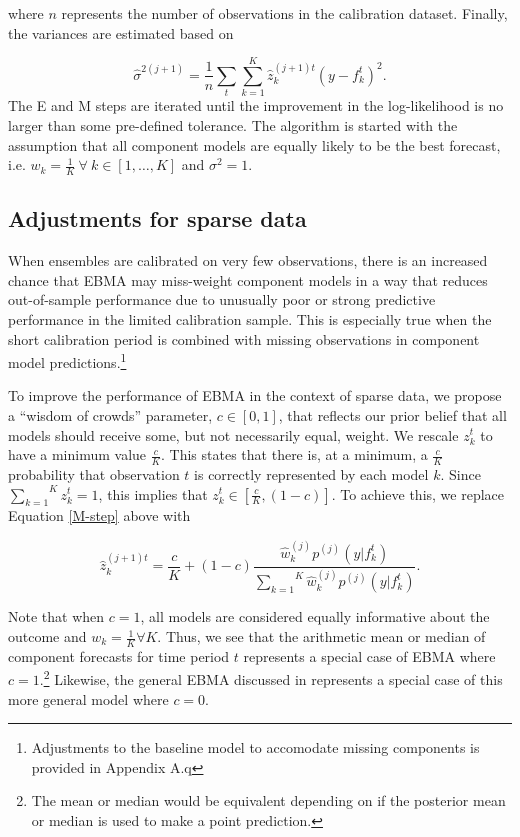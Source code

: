 \documentclass[12pt,fullpage,endnotes]{article}
\begin{document}
\noindent where $n$ represents the number of observations in the
calibration dataset. Finally, the variances are estimated based on

\begin{equation}
\label{sigma}
\hat{\sigma}^{2(j+1)}=\frac{1}{n}\underset{t}{\sum}\overset{K}{\underset{k=1}{\sum}}\hat{z}^{(j+1)t}_{k}(y-f_{k}^{t})^2.
\end{equation}
\noindent The E and M steps are iterated until the improvement in the
log-likelihood is no larger than some pre-defined tolerance. The algorithm is started with the assumption that all component models are equally likely to be the best forecast, i.e. $w_k = \frac{1}{K} ~ \forall ~ k \in [1, \ldots, K]$ and
$\sigma^2=1$.

\subsection{Adjustments for sparse data}

When ensembles are calibrated on very few observations, there is an
increased chance that EBMA may miss-weight component models in a way
that reduces out-of-sample performance due to unusually poor or strong
predictive performance in the limited calibration sample. This is
especially true when the short calibration period is combined with
missing observations in component model
predictions.\footnote{Adjustments to the baseline model to accomodate
  missing components is provided in Appendix A.q}

To improve the performance of EBMA in the context of sparse data, we
propose a ``wisdom of crowds'' parameter, $c \in [0,1]$, that reflects
our prior belief that all models should receive some, but not
necessarily equal, weight. We rescale $z^t_k$ to have a minimum value
$\frac{c}{K}$.  This states that there is, at a minimum, a
$\frac{c}{K}$ probability that observation $t$ is correctly
represented by each model $k$.  Since
$\overset{K}{\underset{k=1}{\sum}} z_k^t = 1$, this implies that
$z_k^t \in [\frac{c}{K}, (1-c)]$.  To achieve this, we replace
Equation \ref{M-step} above with

\begin{equation}
\hat{z}^{(j+1)t}_{k} = \frac{c}{K} + (1-c)\frac{\hat{w}^{(j)}_k
p^{(j)}(y|f_{k}^{t})}{\overset{K}{\underset{k=1}{\sum}}\hat{w}^{(j)}_kp^{(j)}(y|f_{k}^{t})}.
\end{equation}

Note that when $c=1$, all models are considered equally informative
about the outcome and $w_k=\frac{1}{K} \forall K$. Thus, we see that
the arithmetic mean or median of component forecasts for time period
$t$ represents a special case of EBMA where $c=1$.\footnote{The mean
  or median would be equivalent depending on if the posterior mean or
  median is used to make a point prediction.}  Likewise, the general
EBMA discussed in \citet{mhw:2012} represents a special case of this
more general model where $c=0$.
\end{document}
